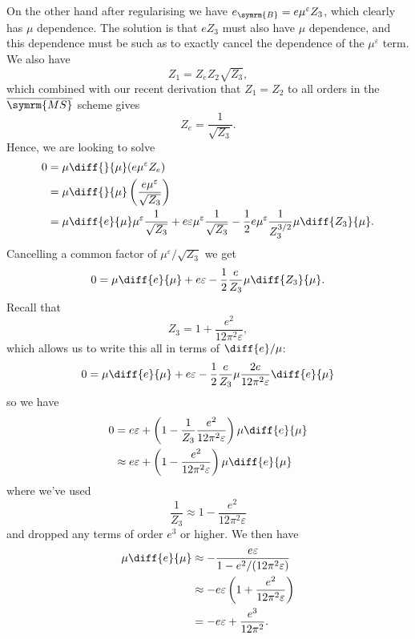 \documentclass[fleqn]{NotesClass}
\newcommand{\MSbar}{\ensuremath{\overline{\symrm{MS}}}}
\newcommand{\bare}{\symrm{B}}
\begin{document}
    On the other hand after regularising we have \(e_{\bare} = e\mu^\varepsilon Z_3\), which clearly has \(\mu\) dependence.
    The solution is that \(eZ_3\) must also have \(\mu\) dependence, and this dependence must be such as to exactly cancel the dependence of the \(\mu^\varepsilon\) term.
    We also have
    \begin{equation}
        Z_1 = Z_e Z_2 \sqrt{Z_3},
    \end{equation}
    which combined with our recent derivation that \(Z_1 = Z_2\) to all orders in the \MSbar{} scheme gives
    \begin{equation}
        Z_e = \frac{1}{\sqrt{Z_3}}.
    \end{equation}
    Hence, we are looking to solve
    \begin{align}
        0 &= \mu \diff{}{\mu}(e\mu^\varepsilon Z_e)\\
        &= \mu \diff{}{\mu}\left( \frac{e\mu^\varepsilon}{\sqrt{Z_3}} \right)\\
        &= \mu \diff{e}{\mu} \mu^\varepsilon \frac{1}{\sqrt{Z_3}} + e\varepsilon \mu^\varepsilon \frac{1}{\sqrt{Z_3}} - \frac{1}{2} e\mu^\varepsilon \frac{1}{Z_3^{3/2}} \mu \diff{Z_3}{\mu}.
    \end{align}
    Cancelling a common factor of \(\mu^\varepsilon / \sqrt{Z_3}\) we get
    \begin{equation}
        0 = \mu \diff{e}{\mu} + e\varepsilon - \frac{1}{2} \frac{e}{Z_3} \mu \diff{Z_3}{\mu}.
    \end{equation}
    Recall that
    \begin{equation}
        Z_3 = 1 + \frac{e^2}{12\pi^2\varepsilon},
    \end{equation}
    which allows us to write this all in terms of \(\diff{e}/{\mu}\):
    \begin{equation}
        0 = \mu \diff{e}{\mu} + e\varepsilon - \frac{1}{2} \frac{e}{Z_3} \mu \frac{2e}{12\pi^2\varepsilon} \diff{e}{\mu}
    \end{equation}
    so we have
    \begin{align}
        0 &= e\varepsilon + \left( 1 - \frac{1}{Z_3}\frac{e^2}{12\pi^2\varepsilon} \right) \mu \diff{e}{\mu}\\
        &\approx e\varepsilon + \left( 1 - \frac{e^2}{12\pi^2\varepsilon} \right) \mu \diff{e}{\mu}
    \end{align}
    where we've used
    \begin{equation}
        \frac{1}{Z_3} \approx 1 - \frac{e^2}{12\pi^2\varepsilon}
    \end{equation}
    and dropped any terms of order \(e^3\) or higher.
    We then have
    \begin{align}
        \mu \diff{e}{\mu} &\approx -\frac{e\varepsilon}{1 - e^2/(12\pi^2\varepsilon)}\\
        &\approx -e\varepsilon\left( 1 + \frac{e^2}{12\pi^2\varepsilon} \right)\\
        &= -e\varepsilon + \frac{e^3}{12\pi^2}.
    \end{align}
    
\end{document}
